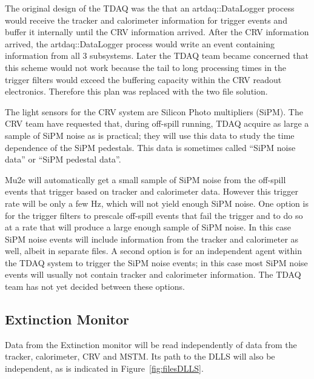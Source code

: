 \begin{sloppypar}
The original design of the TDAQ was the that an {\code artdaq::DataLogger} process
would receive the tracker and calorimeter information for trigger events
and buffer it internally until the CRV information arrived.
After the CRV information arrived,
the {\code artdaq::DataLogger} process would write an event containing information from all 3 subsystems.
Later the TDAQ team became concerned that this scheme would not work because
the tail to long processing times in the trigger filters would exceed the buffering capacity within
the CRV readout electronics.
Therefore this plan was replaced with the two file solution.
\end{sloppypar}

The light sensors for the CRV system are Silicon Photo multipliers (SiPM).
The CRV team have requested that, during off-spill running,
TDAQ acquire as large a sample of SiPM noise as is practical;
they will use this data to study the time dependence of the SiPM pedestals.
This data is sometimes called ``SiPM noise data'' or ``SiPM pedestal data''.

Mu2e will automatically get a small sample of SiPM noise from the off-spill events
that trigger based on tracker and calorimeter data.
However this trigger rate will be only a few Hz, which will not yield enough SiPM noise.
One option is for the trigger filters to prescale off-spill events that fail the trigger
and to do so at a rate that will produce a large enough sample of SiPM noise.
In this case SiPM noise events will include information from the tracker and calorimeter as well,
albeit in separate files.
A second option is for an independent agent within the TDAQ system to trigger the SiPM noise events;
in this case most SiPM noise events will usually not contain tracker and calorimeter information.
The TDAQ team has not yet decided between these options.


\subsection{Extinction Monitor}
\label{ssec:ExtMon}

Data from the Extinction monitor will be read independently of data
from the tracker, calorimeter, CRV and MSTM.
Its path to the DLLS will also be independent, as is indicated in Figure~\ref{fig:filesDLLS}.

